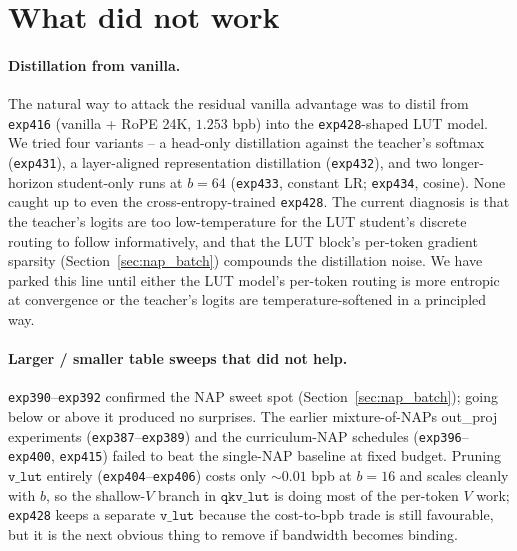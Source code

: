 \documentclass[11pt]{article}
\begin{document}
\section{What did not work}
\label{sec:failures}

\paragraph{Distillation from vanilla.}
The natural way to attack the residual vanilla advantage was to distil from \texttt{exp416} (vanilla + RoPE 24K, $1.253$ bpb) into the \texttt{exp428}-shaped LUT model.
We tried four variants -- a head-only distillation against the teacher's softmax (\texttt{exp431}), a layer-aligned representation distillation (\texttt{exp432}), and two longer-horizon student-only runs at $b{=}64$ (\texttt{exp433}, constant LR; \texttt{exp434}, cosine).
None caught up to even the cross-entropy-trained \texttt{exp428}.
The current diagnosis is that the teacher's logits are too low-temperature for the LUT student's discrete routing to follow informatively, and that the LUT block's per-token gradient sparsity (Section~\ref{sec:nap_batch}) compounds the distillation noise.
We have parked this line until either the LUT model's per-token routing is more entropic at convergence or the teacher's logits are temperature-softened in a principled way.

\paragraph{Larger / smaller table sweeps that did not help.}
\texttt{exp390}--\texttt{exp392} confirmed the NAP sweet spot (Section~\ref{sec:nap_batch}); going below or above it produced no surprises.
The earlier mixture-of-NAPs out\_proj experiments (\texttt{exp387}--\texttt{exp389}) and the curriculum-NAP schedules (\texttt{exp396}--\texttt{exp400}, \texttt{exp415}) failed to beat the single-NAP baseline at fixed budget.
Pruning $\mathtt{v\_lut}$ entirely (\texttt{exp404}--\texttt{exp406}) costs only $\sim 0.01$ bpb at $b{=}16$ and scales cleanly with $b$, so the shallow-$V$ branch in $\mathtt{qkv\_lut}$ is doing most of the per-token $V$ work; \texttt{exp428} keeps a separate $\mathtt{v\_lut}$ because the cost-to-bpb trade is still favourable, but it is the next obvious thing to remove if bandwidth becomes binding.

\end{document}
